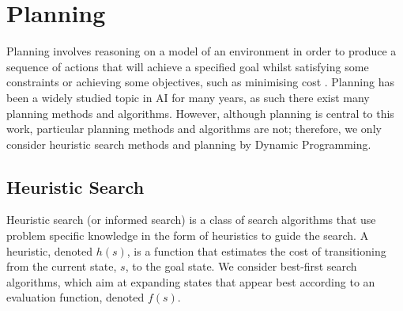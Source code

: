 \section{Planning}
Planning involves reasoning on a model of an environment in order to produce a sequence of actions that will achieve a specified goal whilst satisfying some constraints or achieving some objectives, such as minimising cost \cite{DBLP:books/aw/RN2020, Lav06, GhallabNauTraverso04}. 
Planning has been a widely studied topic in AI for many years, as such there exist many planning methods and algorithms. However, although planning is central to this work, particular planning methods and algorithms are not; therefore, we only consider heuristic search methods and planning by Dynamic Programming.





\subsection{Heuristic Search}
Heuristic search (or informed search) is a class of search algorithms that use problem specific knowledge in the form of heuristics to guide the search. A heuristic, denoted $h(s)$, is a function that estimates the cost of transitioning from the current state, $s$, to the goal state. We consider best-first search algorithms, which aim at expanding states that appear best according to an evaluation function, denoted $f(s)$. 
